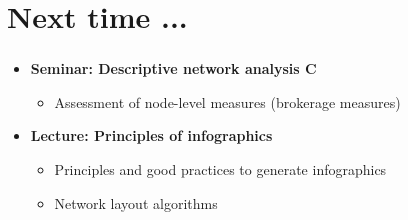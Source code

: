 \documentclass[8pt]{beamer}
\begin{document}




\bgroup
{}
\begin{frame}[plain]{}
\begin{center}
\color{white}{\Huge Questions}
\end{center}
\end{frame}
\egroup







\section*{Next time ...}


\bgroup
{}
\begin{frame}[plain]{}
\begin{center}
\color{white}{\Huge\insertsection}
\end{center}
\end{frame}
\egroup


\begin{frame}
\frametitle{\insertsection}

\begin{itemize}

\item 	\textbf{Seminar: Descriptive network analysis C}
	\begin{itemize}
	\item Assessment of node-level measures (brokerage measures)
	\end{itemize}
	

\medskip
\medskip

\item 	\textbf{Lecture: Principles of infographics}
	\begin{itemize}
	\item Principles and good practices to generate infographics
	\item Network layout algorithms
	\end{itemize}

		
\end{itemize}

\end{frame}
\end{document}
